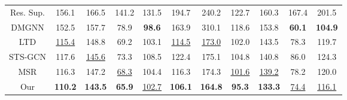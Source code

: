 \begin{table*}[ht]
{\begin{tabular}{c|cc|cc|cc|cc|cc}
        Res. Sup.   & 156.1          & 166.5          & 141.2         & 131.5         & 194.7          & 240.2          & 122.7         & 160.3          & 167.4         & 201.5          \\
        DMGNN       & 152.5          & 157.7          & 78.9          & \textbf{98.6} & 163.9          & 310.1          & 118.6         & 153.8          & \textbf{60.1} & \textbf{104.9} \\
        LTD         & \underline{115.4}    & 148.8          & 69.2          & 103.1         & \underline{114.5}    & \underline{173.0}    & 102.0         & 143.5          & 78.3          & 119.7          \\
        STS-GCN      & 117.6          & \underline{145.6}    & 73.3          & 108.5         & 122.4          & 175.1          & 104.8         & 140.8          & 86.0          & 124.3          \\
        MSR         & 116.3          & 147.2          & \underline{68.3}    & 104.4         & 116.3          & 174.3          & \underline{101.6}   & \underline{139.2}    & 78.2          & 120.0          \\
        Our         & \textbf{110.2} & \textbf{143.5} & \textbf{65.9} & \underline{102.7}   & \textbf{106.1} & \textbf{164.8} & \textbf{95.3} & \textbf{133.3} & \underline{74.4}    & \underline{116.1}   \\ \hline
        \end{tabular}
        }
        

\end{table*}
